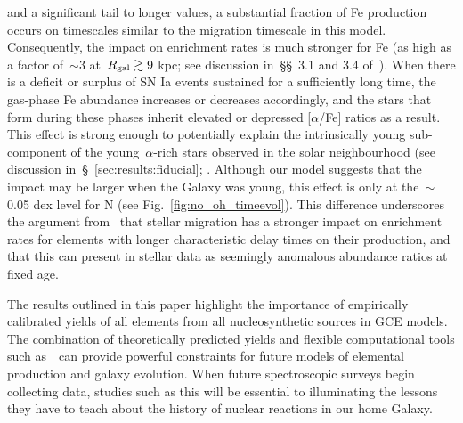 \documentclass[ms.tex]{subfiles}
\begin{document}
and a significant tail to longer values, a substantial fraction of Fe
production occurs on timescales similar to the migration timescale in this
model.
Consequently, the impact on enrichment rates is much stronger for Fe (as high
as a factor of~$\sim$3 at~$R_\text{gal} \gtrsim 9$ kpc; see discussion in~\S\S~3.1 and
3.4 of~\citealp{Johnson2021}).
When there is a deficit or surplus of SN Ia events sustained for a
sufficiently long time, the gas-phase Fe abundance increases or decreases
accordingly, and the stars that form during these phases inherit elevated or
depressed [$\alpha$/Fe] ratios as a result.
This effect is strong enough to potentially explain the intrinsically young
sub-component of the young~$\alpha$-rich stars observed in the solar
neighbourhood (see discussion in~\S~\ref{sec:results:fiducial};
\citealp{Chiappini2015, Martig2015, Martig2016,
Jofre2016, Yong2016, Izzard2018, SilvaAguirre2018, Warfield2021}.
Although our model suggests that the impact may be larger when the Galaxy was
young, this effect is only at the~$\sim$0.05 dex level for N (see
Fig.~\ref{fig:no_oh_timeevol}).
This difference underscores the argument from~\citet{Johnson2021} that stellar
migration has a stronger impact on enrichment rates for elements with longer
characteristic delay times on their production, and that this can present in
stellar data as seemingly anomalous abundance ratios at fixed age.
\par
The results outlined in this paper highlight the importance of empirically
calibrated yields of all elements from all nucleosynthetic sources in GCE
models.
The combination of theoretically predicted yields and flexible computational
tools such as~\vice~can provide powerful constraints for future models of
elemental production and galaxy evolution.
When future spectroscopic surveys begin collecting data, studies such as this
will be essential to illuminating the lessons they have to teach about the
history of nuclear reactions in our home Galaxy.
\end{document}
